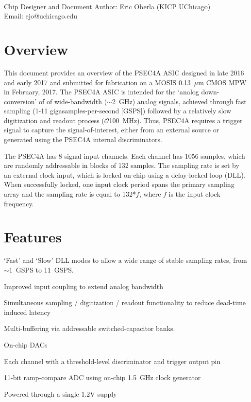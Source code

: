 \documentclass[12pt]{article}
\begin{document}
 \\
\noindent Chip Designer and Document Author: Eric Oberla (KICP UChicago) \\
\noindent Email: ejo@uchicago.edu


\section*{Overview}
\begin{multicols}{2}

  This document provides an overview of the PSEC4A ASIC designed in late 2016 and early 2017 and submitted for fabrication on a MOSIS 0.13~$\mu$m CMOS MPW in February, 2017. The PSEC4A ASIC is intended for the `analog down-conversion' of of wide-bandwidth ($\sim$2~GHz) analog signals, achieved through fast sampling (1-11 gigasamples-per-second [GSPS]) followed by a relatively slow digitization and readout process ($\mathcal{O}$100~MHz). Thus, PSEC4A requires a trigger signal to capture the signal-of-interest, either from an external source or generated using the PSEC4A internal discriminators.

  The PSEC4A has 8 signal input channels. Each channel has 1056 samples, which are randomly addressable in blocks of 132 samples. The sampling rate is set by an external clock input, which is locked on-chip using a delay-locked loop (DLL). When successfully locked, one input clock period spans the primary sampling array and the sampling rate is equal to 132*$f$, where $f$ is the input clock frequency.
  
\end{multicols}

\section*{Features}
\begin{itemize}
{\bf
  \item `Fast' and `Slow' DLL modes to allow a wide range of stable sampling rates, from $\sim$1~GSPS to 11~GSPS.
  \item Improved input coupling to extend analog bandwidth
  \item Simultaneous sampling / digitization / readout functionality to reduce dead-time induced latency
  \item Multi-buffering via addressable switched-capacitor banks.
  \item On-chip DACs
  \item Each channel with a threshold-level discriminator and trigger output pin
  \item 11-bit ramp-compare ADC using on-chip 1.5~GHz clock generator
  \item Powered through a single 1.2V supply
}

    
\end{itemize}
\end{document}
